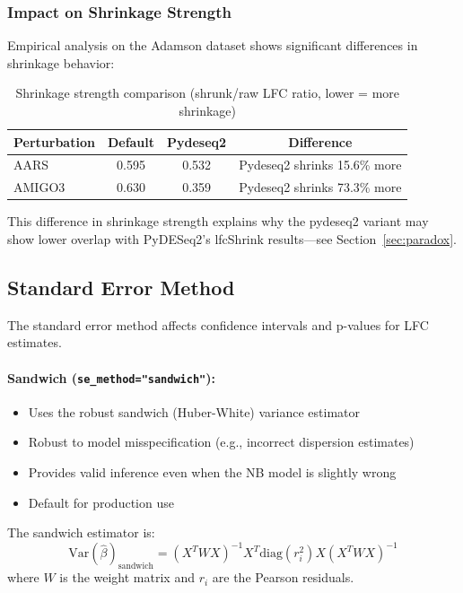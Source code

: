 \documentclass{article}
\begin{document}
\subsubsection{Impact on Shrinkage Strength}

Empirical analysis on the Adamson dataset shows significant differences in shrinkage behavior:

\begin{table}[h]
\centering
\caption{Shrinkage strength comparison (shrunk/raw LFC ratio, lower = more shrinkage)}
\label{tab:shrinkage}
\begin{tabular}{lccc}
\toprule
\textbf{Perturbation} & \textbf{Default} & \textbf{Pydeseq2} & \textbf{Difference} \\
\midrule
AARS & 0.595 & 0.532 & Pydeseq2 shrinks 15.6\% more \\
AMIGO3 & 0.630 & 0.359 & Pydeseq2 shrinks 73.3\% more \\
\bottomrule
\end{tabular}
\end{table}

This difference in shrinkage strength explains why the pydeseq2 variant may show lower overlap with PyDESeq2's lfcShrink results---see Section~\ref{sec:paradox}.

\subsection{Standard Error Method}

The standard error method affects confidence intervals and p-values for LFC estimates.

\paragraph{Sandwich (\texttt{se\_method="sandwich"}):}
\begin{itemize}
    \item Uses the robust sandwich (Huber-White) variance estimator
    \item Robust to model misspecification (e.g., incorrect dispersion estimates)
    \item Provides valid inference even when the NB model is slightly wrong
    \item Default for production use
\end{itemize}

The sandwich estimator is:
\begin{equation}
    \text{Var}(\hat{\beta})_{\text{sandwich}} = (X^T W X)^{-1} X^T \text{diag}(r_i^2) X (X^T W X)^{-1}
\end{equation}
where $W$ is the weight matrix and $r_i$ are the Pearson residuals.
\end{document}
